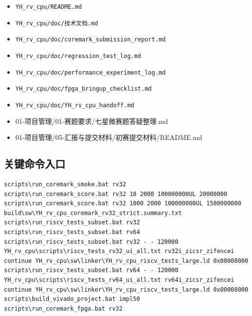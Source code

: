 \begin{itemize}
    \item \texttt{YH\_rv\_cpu/README.md}
    \item \texttt{YH\_rv\_cpu/doc/技术文档.md}
    \item \texttt{YH\_rv\_cpu/doc/coremark\_submission\_report.md}
    \item \texttt{YH\_rv\_cpu/doc/regression\_test\_log.md}
    \item \texttt{YH\_rv\_cpu/doc/performance\_experiment\_log.md}
    \item \texttt{YH\_rv\_cpu/doc/fpga\_bringup\_checklist.md}
    \item \texttt{YH\_rv\_cpu/doc/YH\_rv\_cpu\_handoff.md}
    \item 01-项目管理/01-赛题要求/七星微赛题答疑整理.md
    \item 01-项目管理/05-汇报与提交材料/初赛提交材料/README.md
\end{itemize}

\subsection{关键命令入口}

\begin{verbatim}
scripts\run_coremark_smoke.bat rv32
scripts\run_coremark_score.bat rv32 10 2000 100000000UL 20000000
scripts\run_coremark_score.bat rv32 1000 2000 100000000UL 1500000000 build\sw\YH_rv_cpu_coremark_rv32_strict.summary.txt
scripts\run_riscv_tests_subset.bat rv32
scripts\run_riscv_tests_subset.bat rv64
scripts\run_riscv_tests_subset.bat rv32 - - 120000 YH_rv_cpu\scripts\riscv_tests_rv32_ui_all.txt rv32i_zicsr_zifencei continue YH_rv_cpu\sw\linker\YH_rv_cpu_riscv_tests_large.ld 0x00008000
scripts\run_riscv_tests_subset.bat rv64 - - 120000 YH_rv_cpu\scripts\riscv_tests_rv64_ui_all.txt rv64i_zicsr_zifencei continue YH_rv_cpu\sw\linker\YH_rv_cpu_riscv_tests_large.ld 0x00008000
scripts\build_vivado_project.bat impl50
scripts\run_coremark_fpga.bat rv32
\end{verbatim}
